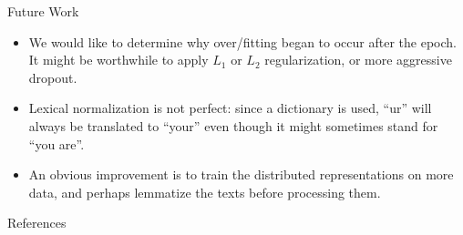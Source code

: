 \documentclass[usepdftitle=false]{beamer}
\begin{document}
\begin{frame}{Future Work}
  \begin{itemize}
  \item We would like to determine why over\-/fitting began to occur
    after the  epoch.  It might be worthwhile to apply \(L_1\)
    or \(L_2\) regularization, or more aggressive dropout.
  \item Lexical normalization is not perfect: since a dictionary is
    used, \enquote{ur} will always be translated to \enquote{your}
    even though it might sometimes stand for \enquote{you are}.
  \item An obvious improvement is to train the distributed
    representations on more data, and perhaps lemmatize the texts
    before processing them.
  \end{itemize}
\end{frame}

\begin{frame}[allowframebreaks]{References}
  \printbibliography[heading=none]
\end{frame}
\end{document}
